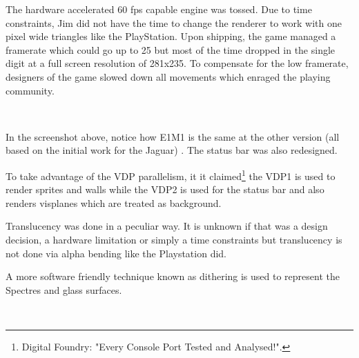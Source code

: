 \par
The hardware accelerated 60 fps capable engine was tossed. Due to time constraints, Jim did not have the time to change the renderer to work with one pixel wide triangles like the PlayStation. Upon shipping, the game managed a framerate which could go up to 25 but most of the time dropped in the single digit at a full screen resolution of 281x235. To compensate for the low framerate, designers of the game slowed down all movements which enraged the playing community.\\
\par
{}







\\
\par
In the screenshot above, notice how E1M1 is the same at the other version (all based on the initial work for the Jaguar) . The status bar was also redesigned.\\
\par
To take advantage of the VDP parallelism, it it claimed\footnote{Digital Foundry: "Every Console Port Tested and Analysed!".} the VDP1 is used to render sprites and walls while the VDP2 is used for the status bar and also renders visplanes which are treated as background.\\
\par 
Translucency was done in a peculiar way. It is unknown if that was a design decision, a hardware limitation or simply a time constraints but translucency is not done via alpha bending like the Playstation did.\\
\par
 A more software friendly technique known as dithering is used to represent the Spectres and glass surfaces.







\\



